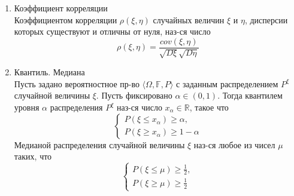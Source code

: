\documentclass[a4paper, 12pt]{article}
\begin{document}
\begin{enumerate}
    \item Коэффициент корреляции\\
    Коэффициентом корреляции $\rho(\xi,\eta)$ случайных величин $\xi$ и $\eta$, дисперсии которых существуют и отличны от нуля, наз-ся число
    \[ \rho(\xi,\eta)=\frac{cov(\xi,\eta)}{\sqrt{D\xi}\sqrt{D\eta}}\]
    
    \item Квантиль. Медиана\\
    Пусть задано вероятностное пр-во $\langle\Omega, \mathbb{F}, P\rangle$ с заданным распределением ${P}^\xi$ случайной величины $\xi$. Пусть фиксировано $\alpha\in(0,1)$. Тогда квантилем уровня $\alpha$ распределения ${P}^\xi$ наз-ся число $x_\alpha \in \mathbb{R}$, такое что
    \begin{equation*}
        \begin{cases}
            P(\xi\leq x_\alpha)\geq\alpha,\\
            P(\xi\geq x_\alpha)\geq1-\alpha
        \end{cases}
    \end{equation*}
    Медианой распределения случайной величины $\xi$ наз-ся любое из чисел $\mu$ таких, что
    \begin{equation*}
        \begin{cases}
            P(\xi\leq\mu)\geq\frac{1}{2},\\
            P(\xi\geq\mu)\geq\frac{1}{2}
        \end{cases}
    \end{equation*}
    

\end{enumerate}
\end{document}
